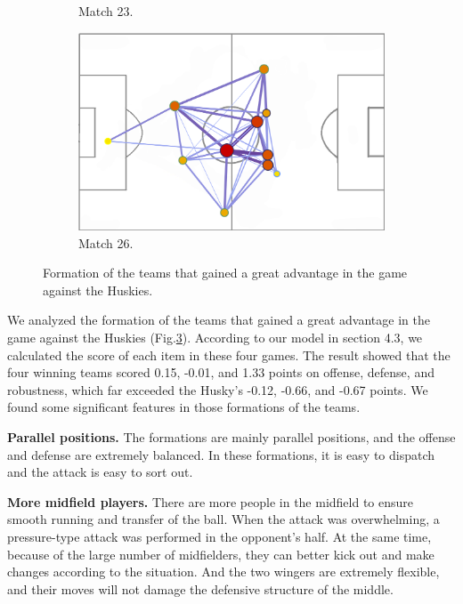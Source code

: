 \documentclass{mcmthesis}
\begin{document}
\begin{figure}[h]
\begin{subfigure}[b]{0.24\textwidth}
		\caption{Match 23.}
		\label{fig:win_team3}
	\end{subfigure}
	\begin{subfigure}[b]{0.24\textwidth}
		\includegraphics[width=\textwidth]{figures/win_team4.png}
		\caption{Match 26.}
		\label{fig:win_team4}
	\end{subfigure}
	\caption{Formation of the teams that gained a great advantage in the game against the Huskies.}
	\label{fig:win_team}
\end{figure}
We analyzed the formation of the teams that gained a great advantage in the game against the Huskies (Fig.\ref{fig:win_team}). According to our model in section 4.3, we calculated the score of each item in these four games. The result showed that the four winning teams scored 0.15, -0.01, and 1.33 points on offense, defense, and robustness, which far exceeded the Husky's -0.12, -0.66, and -0.67 points. We found some significant features in those formations of the teams.\par
\textbf{Parallel positions.} The formations are mainly parallel positions, and the offense and defense are extremely balanced. In these formations, it is easy to dispatch and the attack is easy to sort out.\par
\textbf{More midfield players.} There are more people in the midfield to ensure smooth running and transfer of the ball. When the attack was overwhelming, a pressure-type attack was performed in the opponent's half. At the same time, because of the large number of midfielders, they can better kick out and make changes according to the situation. And the two wingers are extremely flexible, and their moves will not damage the defensive structure of the middle.\par
\end{document}
